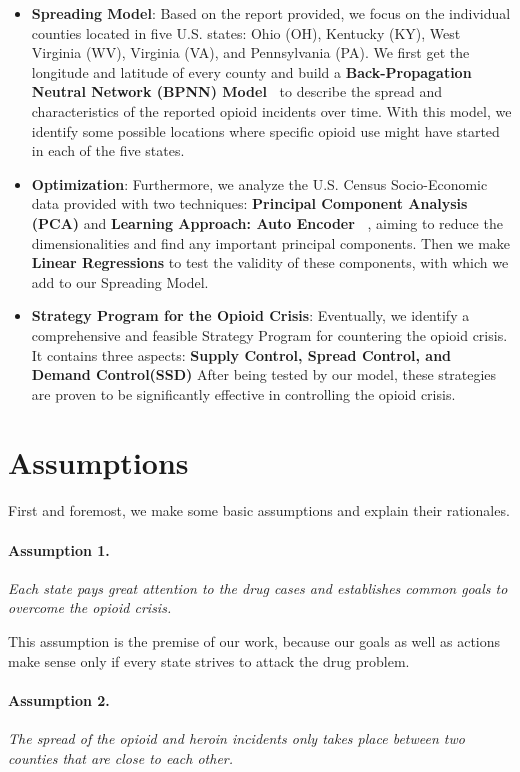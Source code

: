 \documentclass{mcmthesis}
\begin{document}
\begin{itemize}
\item \textbf{Spreading Model}: Based on the report provided, we focus on the individual counties located in five U.S. states: Ohio (OH), Kentucky (KY), West Virginia (WV), Virginia (VA), and Pennsylvania (PA). We first get the longitude and latitude of every county and build a \textbf{Back-Propagation Neutral Network (BPNN) Model~\cite{NURCIN2017417}} to describe the spread and characteristics of the reported opioid incidents over time. With this model, we identify some possible locations where specific opioid use might have started in each of the five states.
\item \textbf{Optimization}: Furthermore, we analyze the U.S. Census Socio-Economic data provided with two techniques:   \textbf{Principal Component Analysis (PCA)} and \textbf{Learning Approach: Auto Encoder~\cite{NURCIN2017417}} ,  aiming to reduce the dimensionalities and find any important principal components. Then we make \textbf{Linear Regressions} to test the validity of these components, with which we add to our Spreading Model.
\item \textbf{Strategy Program for the Opioid Crisis}: Eventually, we identify a comprehensive and feasible Strategy Program for countering the opioid crisis. It contains three aspects: \textbf{Supply Control, Spread Control, and Demand Control(SSD)} After being tested by our model, these strategies are proven to be significantly effective in controlling the opioid crisis.
\end{itemize}

\section{Assumptions}\label{Sec-Assume}
First and foremost, we make some basic assumptions and explain their rationales.
	\paragraph{Assumption 1.}\itshape{Each state pays great attention to the drug cases and establishes common goals to overcome the opioid crisis.}
	
	\upshape This assumption is the premise of our work, because our goals as well as actions make sense only if every state strives to attack the drug problem.
	
	\paragraph{Assumption 2.}\itshape{The spread of the opioid and heroin incidents only takes place between two counties that are close to each other.}
	
\end{document}
